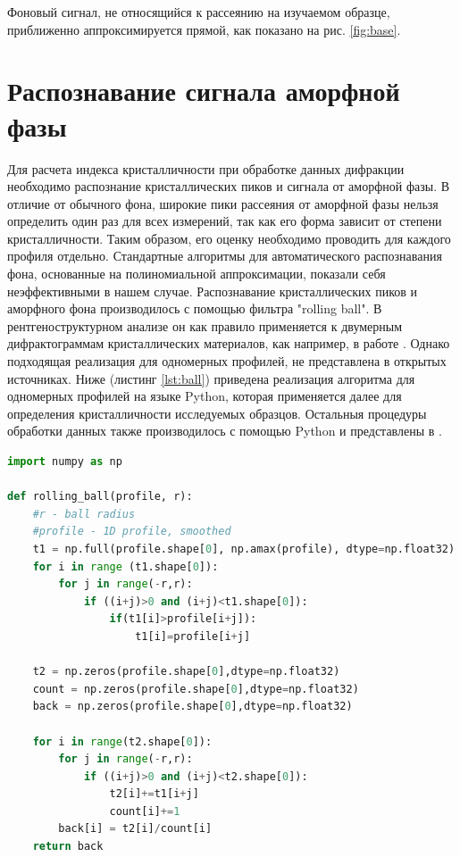 Фоновый сигнал, не относящийся к рассеянию на изучаемом образце, приближенно аппроксимируется прямой, как показано на рис. \ref{fig:base}.



\section{Распознавание сигнала аморфной фазы}

	
	Для расчета индекса кристалличности при обработке данных дифракции необходимо распознание кристаллических пиков и сигнала от аморфной фазы.
	В отличие от обычного фона, широкие пики рассеяния от аморфной фазы нельзя определить один раз для всех измерений, так как его форма зависит от степени кристалличности. Таким образом, его оценку необходимо проводить для каждого профиля отдельно.
	Стандартные алгоритмы для автоматического распознавания фона, основанные на полиномиальной аппроксимации, показали себя неэффективными в нашем случае. Распознавание кристаллических пиков и аморфного фона производилось с помощью фильтра "rolling ball". В рентгеноструктурном анализе он как правило применяется к двумерным дифрактограммам кристаллических материалов, как например, в работе \cite{ball2018}. Однако подходящая реализация для одномерных профилей, не представлена в открытых источниках. Ниже (листинг \ref{lst:ball}) приведена реализация алгоритма для одномерных профилей на языке Python, которая применяется далее для определения кристалличности исследуемых образцов. Остальныя процедуры обработки данных также производилось с помощью Python и представлены в \cite{git}.
	 
\vspace{5px}
	\begin{lstlisting}[language=Python, caption= Реализация распознавание кристаллических пиков по алгоритму "rolling ball", label={lst:ball}]
import numpy as np

def rolling_ball(profile, r):
    #r - ball radius
    #profile - 1D profile, smoothed
    t1 = np.full(profile.shape[0], np.amax(profile), dtype=np.float32)
    for i in range (t1.shape[0]):
        for j in range(-r,r):
            if ((i+j)>0 and (i+j)<t1.shape[0]):
                if(t1[i]>profile[i+j]):
                    t1[i]=profile[i+j]
                    
    t2 = np.zeros(profile.shape[0],dtype=np.float32)
    count = np.zeros(profile.shape[0],dtype=np.float32)
    back = np.zeros(profile.shape[0],dtype=np.float32) 
    
    for i in range(t2.shape[0]): 
        for j in range(-r,r):
            if ((i+j)>0 and (i+j)<t2.shape[0]):
                t2[i]+=t1[i+j]
                count[i]+=1
        back[i] = t2[i]/count[i]
    return back
 

\end{lstlisting}
\vspace{5px}


